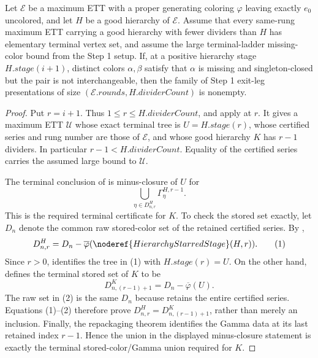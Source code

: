 \begin{lemma}
Let $\mathcal E$ be a maximum ETT with a proper generating coloring
$\varphi$ leaving exactly $e_0$ uncolored, and let $H$ be a good
hierarchy of $\mathcal E$.  Assume that every same-rung maximum ETT
carrying a good hierarchy with fewer dividers than $H$ has elementary
terminal vertex set, and assume the large terminal-ladder missing-color
bound from the Step 1 setup.  If, at a positive hierarchy stage
$H.\mathit{stage}(i+1)$, distinct colors $\alpha,\beta$ satisfy that
$\alpha$ is missing and singleton-closed but the pair is not
interchangeable, then the family of Step 1 exit-leg presentations of
size $(\mathcal E.\mathit{rounds},H.\mathit{dividerCount})$ is nonempty.
\end{lemma}
\begin{proof}
Put $r=i+1$.  Thus $1\leq r\leq H.\mathit{dividerCount}$, and apply
 at $r$.  It gives a maximum ETT
$\mathcal U$ whose exact terminal tree is $U=H.\mathit{stage}(r)$, whose
certified series and rung number are those of $\mathcal E$, and whose
good hierarchy $K$ has $r-1$ dividers.  In particular
$r-1<H.\mathit{dividerCount}$.  Equality of the certified series carries
the assumed large bound to $\mathcal U$.

The terminal conclusion of  is
minus-closure of $U$ for
\[
 \bigcup_{\eta\in D^H_{n,r}}\Gamma^{H,r-1}_\eta .
\]
This is the required terminal certificate for $K$.  To check the stored
set exactly, let $D_n$ denote the common raw stored-color set of the
retained certified series.  By ,
\[
 D^H_{n,r}=D_n-\overline\varphi
   (\noderef{HierarchyStarredStage}(H,r)).                 \tag{1}
\]
Since $r>0$,  identifies the tree in
(1) with $H.\mathit{stage}(r)=U$.  On the other hand,
 defines the terminal stored set
of $K$ to be
\[
 D^K_{n,(r-1)+1}=D_n-\overline\varphi(U).                  \tag{2}
\]
The raw set in (2) is the same $D_n$ because
 retains the entire certified
series.  Equations (1)--(2) therefore prove
$D^H_{n,r}=D^K_{n,(r-1)+1}$, rather than merely an inclusion.  Finally,
the repackaging theorem identifies the Gamma data at its last retained
index $r-1$.  Hence the union in the displayed minus-closure statement
is exactly the terminal stored-color/Gamma union required for $K$.


\end{proof}
